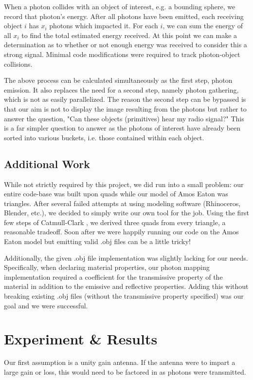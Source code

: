 \documentclass[%
        final,
        notitlepage,
        narroweqnarray,
        inline,
        twoside,
        ]{ieee}
\begin{document}
When a photon collides with an object of interest, e.g. a bounding sphere, we
record that photon's energy.  After all photons have been emitted, each 
receiving object $i$ has $x_i$ photons which impacted it.  For each $i$, we
can sum the energy of all $x_i$ to find the total estimated energy received.
At this point we can make a determination as to whether or not enough energy
was received to consider this a strong signal.  Minimal code modifications
were required to track photon-object collisions.

The above process can be calculated simultaneously as the first step, photon
emission.  It also replaces the need for a second step, namely photon
gathering, which is not as easily parallelized.  The reason the second step can
be bypassed is that our aim is not to display the image resulting from the
photons but rather to answer the question, "Can these objects (primitives) hear
my radio signal?"  This is a far simpler question to answer as the photons of
interest have already been sorted into various buckets, i.e. those contained
within each object.

\subsection{Additional Work}
While not strictly required by this project, we did run into a small problem:
our entire code-base was built upon quads while our model of Amos Eaton was
triangles.  After several failed attempts at using modeling software
(Rhinoceros, Blender, etc.), we decided to simply write our own tool for the
job.  Using the first few steps of Catmull-Clark \cite{Catmull1978350}, we
derived three quads from every triangle, a reasonable tradeoff.  Soon after we
were happily running our code on the Amos Eaton model but emitting valid .obj
files can be a little tricky!

Additionally, the given .obj file implementation was slightly lacking for our
needs.  Specifically, when declaring material properties, our photon mapping
implementation required a coefficient for the transmissive property of the
material in addition to the emissive and reflective properties.  Adding this
without breaking existing .obj files (without the transmissive property
specified) was our goal and we were successful.

\section{Experiment \& Results}
Our first assumption is a unity gain antenna. If the antenna were to impart
a large gain or loss, this would need to be factored in as photons were 
transmitted.
\end{document}
